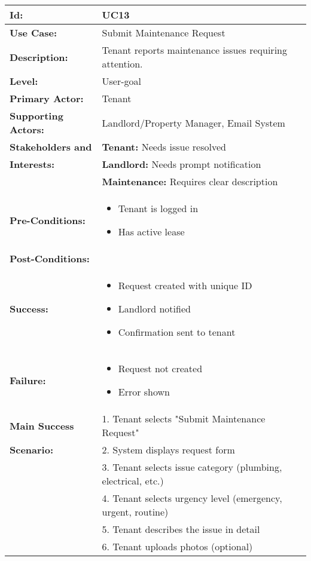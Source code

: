\documentclass[12pt]{article}
\begin{document}
\begin{tabular}{|p{3cm}|p{11cm}|}
\hline
\textbf{Id:} & UC13 \\
\hline
\textbf{Use Case:} & Submit Maintenance Request \\
\hline
\textbf{Description:} & Tenant reports maintenance issues requiring attention. \\
\hline
\textbf{Level:} & User-goal \\
\hline
\textbf{Primary Actor:} & Tenant \\
\hline
\textbf{Supporting Actors:} & Landlord/Property Manager, Email System \\
\hline
\textbf{Stakeholders and} & \textbf{Tenant:} Needs issue resolved \\
\textbf{Interests:} & \textbf{Landlord:} Needs prompt notification \\
& \textbf{Maintenance:} Requires clear description \\
\hline
\textbf{Pre-Conditions:} & 
\begin{itemize}
    \item Tenant is logged in
    \item Has active lease
\end{itemize} \\
\hline
\textbf{Post-Conditions:} & \\
\textbf{Success:} & 
\begin{itemize}
    \item Request created with unique ID
    \item Landlord notified
    \item Confirmation sent to tenant
\end{itemize} \\
\textbf{Failure:} & 
\begin{itemize}
    \item Request not created
    \item Error shown
\end{itemize} \\
\hline
\textbf{Main Success} & 1. Tenant selects "Submit Maintenance Request" \\
\textbf{Scenario:} & 2. System displays request form \\
& 3. Tenant selects issue category (plumbing, electrical, etc.) \\
& 4. Tenant selects urgency level (emergency, urgent, routine) \\
& 5. Tenant describes the issue in detail \\
& 6. Tenant uploads photos (optional) \\

\end{tabular}
\end{document}
